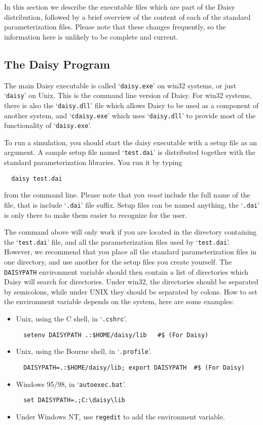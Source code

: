 In this section we describe the executable files which are part of the
Daisy distribution, followed by a brief overview of the content of
each of the standard parameterization files.  Please note that these
changes frequently, so the information here is unlikely to be
complete and current.

\subsection{The Daisy Program}

The main Daisy executable is called `\texttt{daisy.exe}' on win32
systems, or just `\texttt{daisy}' on Unix.  This is the command line
version of Daisy.  For win32 systems, there is also the
`\texttt{daisy.dll}' file which allows Daisy to be used as a component of
another system, and `\texttt{cdaisy.exe}' which uses
`\texttt{daisy.dll}' to provide most of the functionality of
`\texttt{daisy.exe}'.

To run a simulation, you should start the daisy executable with a
setup file as an argument.  A sample setup file named
`\texttt{test.dai}' is distributed together with the standard
parameterization libraries.  You run it by typing
\begin{verbatim}
  daisy test.dai
\end{verbatim}
from the command line.  Please note that you \emph{must} include the
full name of the file, that is include `\texttt{.dai}' file suffix.
Setup files can be named anything, the `\texttt{.dai}' is only there
to make them easier to recognize for the user.

The command above will only work if you are located in the directory
containing the `\texttt{test.dai}' file, and all the parameterization
files used by `\texttt{test.dai}'.  However, we recommend that you
place all the standard parameterization files in one directory, and
use another for the setup files you create yourself.  The
\texttt{DAISYPATH} environment variable should then contain a list of
directories which Daisy will search for directories.  Under win32, the
directories should be separated by semicolons, while under UNIX they
should be separated by colons.  How to set the environment variable
depends on the system, here are some examples:
\begin{itemize}
\item Unix, using the C shell, in `\texttt{.cshrc}'.
\begin{verbatim}
  setenv DAISYPATH .:$HOME/daisy/lib   #$ (For Daisy)
\end{verbatim}
\item Unix, using the Bourne shell, in `\texttt{.profile}'.
\begin{verbatim}
  DAISYPATH=.:$HOME/daisy/lib; export DAISYPATH  #$ (For Daisy)
\end{verbatim}
\item Windows 95/98, in `\texttt{autoexec.bat}'.
\begin{verbatim}
  set DAISYPATH=.;C:\daisy\lib
\end{verbatim}
\item Under Windows NT, use \texttt{regedit} to add the environment
  variable. 
\end{itemize}

